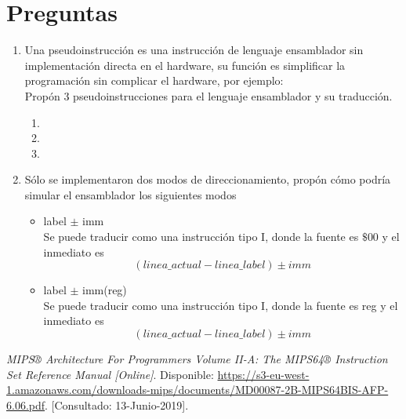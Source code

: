 \documentclass{article}
\begin{document}
    \section{Preguntas}
    \begin{enumerate}

    \item {
    Una pseudoinstrucción es una instrucción de lenguaje ensamblador sin implementación directa en el hardware, su función es simplificar la programación sin complicar el hardware, por ejemplo:\\

    Propón 3 pseudoinstrucciones para el lenguaje ensamblador y su traducción.\\
	
	\begin{enumerate}
		\item {
		
		}
		\item {
		
		}
		\item {
		
		}
	\end{enumerate}
	}

	\item {
	Sólo se implementaron dos modos de direccionamiento, propón cómo podría
	simular el ensamblador los siguientes modos
	\begin{itemize}
		\item {
			label $\pm$ imm \\
			Se puede traducir como una instrucción tipo I, donde la fuente es 
			$\$00$ y el inmediato es
			\[(linea\_actual - linea\_label) \pm imm\]
		}
		\item {
			label $\pm$ imm(reg) \\
			Se puede traducir como una instrucción tipo I, donde la fuente es 
			reg y el inmediato es
			\[(linea\_actual - linea\_label) \pm imm\]
		}
	\end{itemize}

	}

    \end{enumerate}

 \begin{thebibliography}{1}
	\textit{MIPS® Architecture For Programmers Volume II-A: The MIPS64® Instruction Set Reference Manual [Online]}. Disponible:
	\url{https://s3-eu-west-1.amazonaws.com/downloads-mips/documents/MD00087-2B-MIPS64BIS-AFP-6.06.pdf}.
	[Consultado: 13-Junio-2019].


\end{thebibliography}
\end{document}
